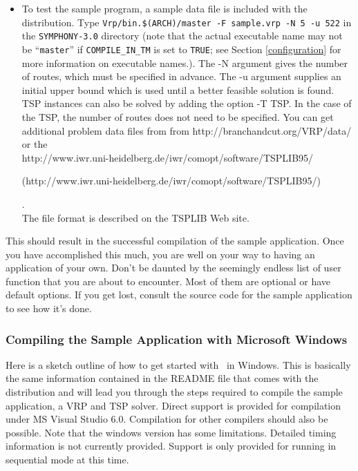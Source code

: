\begin{itemize}
        \item To test the sample program, a sample data file is included with
the distribution. Type {\tt Vrp/bin.\$(ARCH)/master -F sample.vrp -N 5 -u
522} in the {\tt SYMPHONY-3.0} directory (note that the actual executable name may
not be ``{\tt master}'' if {\tt COMPILE\_IN\_TM} is set to {\tt TRUE}; see
Section \ref{configuration} for more information on executable names.). The -N
argument gives the number of routes, which must be specified in advance. The
-u argument supplies an initial upper bound which is used until a better
feasible solution is found. TSP instances can also be solved by adding the
option -T TSP. In the case of the TSP, the number of routes does not need to
be specified. You can get additional problem data files from from
{http://branchandcut.org/VRP/data/} or the \\
{http://www.iwr.uni-heidelberg.de/iwr/comopt/software/TSPLIB95/}
\begin{latexonly}
        (http://www.iwr.uni-heidelberg.de/iwr/comopt/software/TSPLIB95/)
\end{latexonly}. \\
The file
format is described on the TSPLIB Web site.

\end{itemize}

\noindent This should result in the successful compilation of the sample
application. Once you have accomplished this much, you are well on
your way to having an application of your own. Don't be daunted by the
seemingly endless list of user function that you are about to
encounter. Most of them are optional or have default options. If you
get lost, consult the source code for the sample application to see
how it's done.

\subsubsection{Compiling the Sample Application with Microsoft Windows}

Here is a sketch outline of how to get started with \BB\ in Windows. This is
basically the same information contained in the README file that comes with
the distribution and will lead you through the steps required to compile the
sample application, a VRP and TSP solver. Direct support is provided for
compilation under MS Visual Studio 6.0. Compilation for other compilers should
also be possible. Note that the windows version has some limitations. Detailed
timing information is not currently provided.  Support is only provided for
running in sequential mode at this time.

